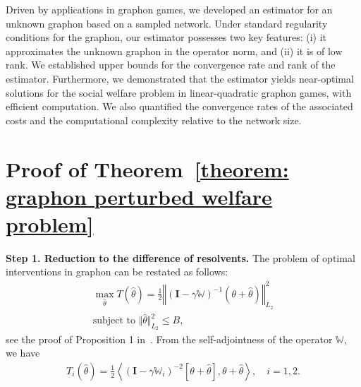 \documentclass[11pt]{article}
\newcommand{\bI}{\bm{I}}
\newcommand{\bbW}{\mathbb{W}}
\newcommand{\<}{\langle}
\renewcommand{\>}{\rangle}
\theoremstyle{plain}
\theoremstyle{definition}
\theoremstyle{remark}
\begin{document}
Driven by applications in graphon games, we developed an estimator for an unknown graphon based on a sampled network. Under standard regularity conditions for the graphon, our estimator possesses two key features: (i) it approximates the unknown graphon in the operator norm, and (ii) it is of low rank. We established upper bounds for the convergence rate and rank of the estimator. Furthermore, we demonstrated that the estimator yields near-optimal solutions for the social welfare problem in linear-quadratic graphon games, with efficient computation. We also quantified the convergence rates of the associated costs and the computational complexity relative to the network size.






\newpage










\appendix


\section{Proof of Theorem~\ref{theorem: graphon perturbed welfare problem}}\label {proof_graphon_perturbed_welfare_problem}

\noindent \textbf{Step 1. Reduction to the difference of resolvents.} The problem of optimal interventions in graphon can be restated as follows:
\begin{align*}
    \max_{\hat{\theta}} T(\hat{\theta}) = \frac{1}{2} \left \Vert  \left ( \bI - \gamma \bbW \right )^{-1} (\theta + \hat \theta) \right \Vert_{L_2}^2 \\
    \text{subject to } \Vert \hat \theta\Vert^2_{L_2} \le B,
\end{align*}
see the proof of Proposition 1 in~\citep{Parise_Ozdaglar_Econometrica}. From the self-adjointness of the operator $\bbW$, we have
\begin{align*}
    T_i(\hat{\theta}) = \frac{1}{2} \left \langle (\bI - \gamma \bbW_i)^{-2} [\theta + \hat{\theta}], \theta + \hat \theta \right \rangle, \quad i = 1, 2.
\end{align*}
\end{document}
